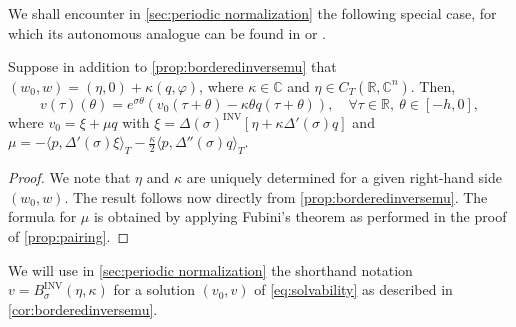 \documentclass[english]{myarticle}
\DeclareMathOperator{\inv}{INV}
\begin{document}
\begin{sloppypar}
We shall encounter in \cref{sec:periodic normalization} the following special case, for which its autonomous analogue can be found in \cite[Corollary 3.7]{Janssens2010} or \cite[Lemma 4]{Bosschaert2020}.

\begin{corollary} \label{cor:borderedinversemu}
Suppose in addition to \cref{prop:borderedinversemu} that $(w_0,w) = (\eta,0) + \kappa(q,\varphi)$, where $\kappa \in \mathbb{C}$ and $\eta \in C_T(\mathbb{R},\mathbb{C}^n)$. Then,
\begin{equation*}
    v(\tau)(\theta) = e^{\sigma \theta}(v_0(\tau + \theta) - \kappa \theta q(\tau+\theta)), \quad \forall \tau \in \mathbb{R}, \ \theta \in [-h,0], 
\end{equation*}
where $v_0 = \xi + \mu q$ with $\xi = \Delta(\sigma)^{\inv} [ \eta + \kappa \Delta '(\sigma) q ]$ and $ \mu = -\langle p, \Delta'(\sigma)\xi \rangle_T - \frac{\kappa}{2} \langle p, \Delta''(\sigma)q \rangle_T$.
\begin{proof}
We note that $\eta$ and $\kappa$ are uniquely determined for a given right-hand side $(w_0,w)$. The result follows now directly from \cref{prop:borderedinversemu}. The formula for $\mu$ is obtained by applying Fubini's theorem as performed in the proof of \cref{prop:pairing}.
\end{proof}
\end{corollary}
We will use in \cref{sec:periodic normalization} the shorthand notation $v = B_{\sigma}^{\inv}(\eta,\kappa)$ for a solution $(v_0,v)$ of \eqref{eq:solvability} as described in \cref{cor:borderedinversemu}.


\end{sloppypar}
\end{document}
